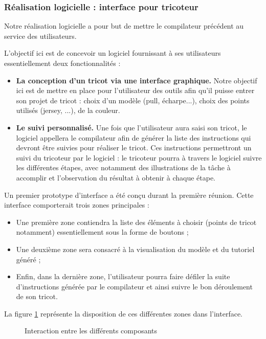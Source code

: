 \documentclass{article}
\begin{document}
\subsubsection{Réalisation logicielle : interface pour tricoteur}

Notre réalisation logicielle a pour but de mettre le compilateur précédent au service des utilisateurs.

L'objectif ici est de concevoir un logiciel fournissant à ses utilisateurs essentiellement deux fonctionnalités :
\begin{itemize}
  \item \textbf{La conception d'un tricot via une interface graphique.} Notre objectif ici est de mettre en place pour l'utilisateur des
  outils afin qu'il puisse entrer son projet de tricot : choix d'un modèle (pull, écharpe...), choix des points utilisés
  (jersey, ...), de la couleur.
  \item \textbf{Le suivi personnalisé.} Une fois que l'utilisateur aura saisi son tricot, le logiciel appellera le compilateur afin de générer
la liste des instructions qui devront être suivies pour réaliser le tricot. Ces instructions permettront un suivi du tricoteur par le
logiciel : le tricoteur pourra à travers le logiciel suivre les différentes étapes, avec notamment des illustrations de la tâche à
accomplir et l'observation du résultat à obtenir à chaque étape.
\end{itemize}

Un premier prototype d'interface a été conçu durant la première réunion. Cette interface comporterait trois zones principales :
\begin{itemize}
  \item Une première zone contiendra la liste des éléments à choisir (points de tricot notamment) essentiellement sous la forme de 
boutons ;
  \item Une deuxième zone sera consacré à la visualisation du modèle et du tutoriel généré ;
  \item Enfin, dans la dernière zone, l'utilisateur pourra faire défiler la suite d'instructions générée par le compilateur et ainsi 
suivre le bon déroulement de son tricot.
\end{itemize}

La figure \ref{interface} représente la disposition de ces différentes zones dans l'interface.

\begin{figure}[!h]
  \centering
  \caption{Interaction entre les différents composants}
  \label{interface}
  \end{figure}
\end{document}
